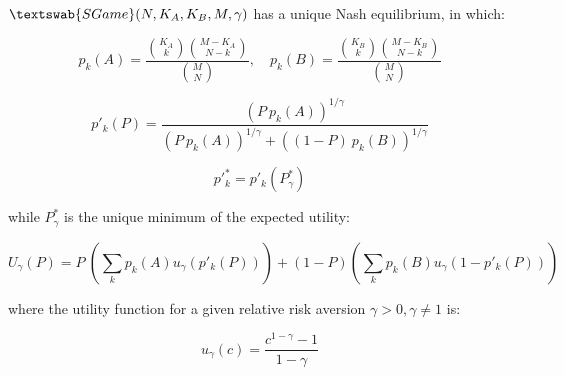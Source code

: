 \documentclass{beamer}
\theoremstyle{definition}
\newcommand{\SG}[1]{$\textswab{SGame}(#1)$}
\begin{document}
\begin{frame}[shrink=25]{}


    \begin{theorem}
\label{thm:StatisticalGameEquilibrium}
\SG{N,K_A,K_B,M,\gamma} has a unique Nash equilibrium, in which:

\begin{equation}
    \label{thm:StatisticalEqHypergeom}
    p_k(A) = \frac{\binom{K_A}{k} \binom{M-K_A}{N-k}}{\binom{M}{N}}, \quad
    p_k(B) = \frac{\binom{K_B}{k} \binom{M-K_B}{N-k}}{\binom{M}{N}}
\end{equation}

\begin{equation}
\label{eq:ppkPgamma}
    p'_k(P) = \frac{\left ( P \ p_k(A) \right )^{1/\gamma}}{\left ( P \ p_k(A) \right )^{1/\gamma} + \left ( (1-P) \ p_k(B) \right )^{1/\gamma}}
\end{equation}

\begin{equation}
    p'^*_k = p'_k(P^*_\gamma)
\end{equation}

while $P^*_\gamma$ is the unique minimum of the expected utility:

\begin{equation}
    \label{eq:SGameExpectedUtility}
    U_\gamma(P) = P \ \left ( \sum_k p_k(A) u_\gamma(p'_k(P)) \right ) 
    + (1-P) \left ( \sum_k p_k(B) u_\gamma(1-p'_k(P)) \right )
\end{equation}

where the utility function for a given relative risk aversion $\gamma>0, \gamma \ne 1$ is:

\begin{equation}
    u_\gamma(c) = \frac{c^{1-\gamma}-1}{1-\gamma}
\end{equation}

\end{theorem}

\end{frame}
\end{document}
